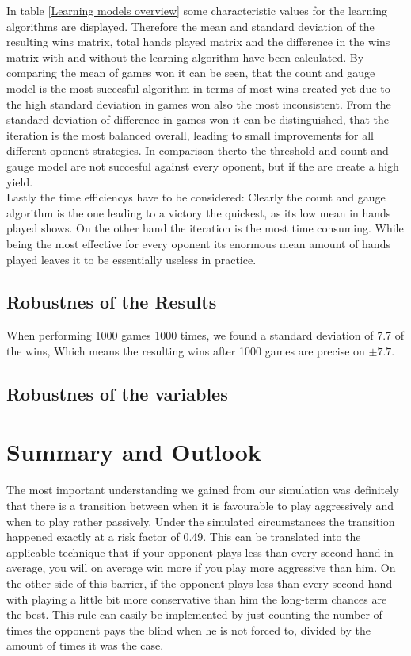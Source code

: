 \documentclass[11pt]{article}
\begin{document}
In table \ref{Learning models overview} some characteristic values for the learning algorithms are displayed. Therefore the mean and standard deviation of the resulting wins matrix, total hands played matrix and the difference in the wins matrix with and without the learning algorithm have been calculated. By comparing the mean of games won it can be seen, that the count and gauge model is the most succesful algorithm in terms of most wins created yet due to the high standard deviation in games won also the most inconsistent. From the standard deviation of difference in games won it can be distinguished, that the iteration is the most balanced overall, leading to small improvements for all different oponent strategies. In comparison therto the threshold and count and gauge model are not succesful against every oponent, but if the are create a high yield. \\

Lastly the time efficiencys have to be considered: Clearly the count and gauge algorithm is the one leading to a victory the quickest, as its low mean in hands played shows. On the other hand the iteration is the most time consuming. While being the most effective for every oponent its enormous mean amount of hands played leaves it to be essentially useless in practice.




\subsection{Robustnes of the Results}
When performing 1000 games 1000 times, we found a standard deviation of 7.7 of the wins, Which means the resulting wins after 1000 games are precise on $\pm 7.7$.
\subsection{Robustnes of the variables}




\section{Summary and Outlook}

The most important understanding we gained from our simulation was definitely that there is a transition between when it is favourable to play aggressively and when to play rather passively. Under the simulated circumstances the transition happened exactly at a risk factor of 0.49. This can be translated into the applicable technique that if your opponent plays less than every second hand in average, you will on average win more if you play more aggressive than him. On the other side of this barrier, if the opponent plays less than every second hand with playing a little bit more conservative than him the long-term chances are the best. This rule can easily be implemented by just counting the number of times the opponent pays the blind when he is not forced to, divided by the amount of times it was the case.\\
\end{document}
